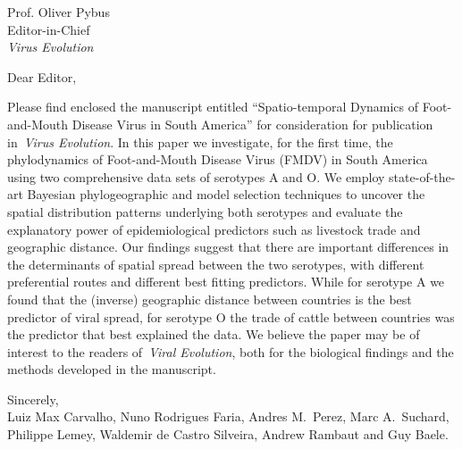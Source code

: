 \documentclass[standard, 
               backaddress=off, 
               foldmarks=false, 
               enlargefirstpage,
               pagenumber=off,
               parskip=half
               ]{scrlttr2}
\def\title{Spatio-temporal Dynamics of Foot-and-Mouth Disease Virus in South America}
\begin{document}

\begin{letter}{%
    Prof. Oliver Pybus \\%
    Editor-in-Chief\\%
    \emph{Virus Evolution}
}

\opening{Dear Editor,}

Please find enclosed the manuscript entitled “\title” for consideration for publication in~\emph{Virus Evolution}.
In this paper we investigate, for the first time, the phylodynamics of Foot-and-Mouth Disease Virus (FMDV) in South America using two comprehensive data sets of serotypes A and O.
We employ state-of-the-art Bayesian phylogeographic and model selection techniques to uncover the spatial distribution patterns underlying both serotypes and evaluate the explanatory power of epidemiological predictors such as livestock trade and geographic distance.
Our findings suggest that there are important differences in the determinants of spatial spread between the two serotypes, with different preferential routes and different best fitting predictors.
While for serotype A we found that the (inverse) geographic distance between countries is the best predictor of viral spread, for serotype O the trade of cattle between countries was the predictor that best explained the data.
We believe the paper may be of interest to the readers of~\emph{Viral Evolution}, both for the biological findings and the methods developed in the manuscript.

\vspace{0.1cm}
Sincerely, \\
Luiz Max Carvalho, 
Nuno Rodrigues Faria, 
Andres M.~Perez, 
Marc A.~Suchard, 
Philippe Lemey, 
Waldemir de Castro Silveira, 
Andrew Rambaut
and Guy Baele.

\end{letter}
\end{document}
